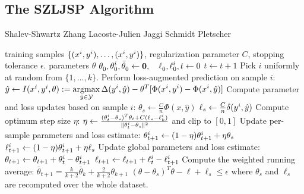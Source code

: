 \subsection{The SZLJSP Algorithm}
\begin{algorithm}[tp]
    \caption{Shalev-Shwartz Zhang Lacoste-Julien Jaggi Schmidt Pletscher\label{alg_szljsp}}
    \begin{doublespacing}
    \begin{algorithmic}[1]
        \Require training samples $\{ (x^{i}, y^{i}), \dots, (x^{i}, y^{i})\}$, regularization parameter $C$, stopping tolerance $\epsilon$.
        \Ensure parameters $\theta$
        \State  $\displaystyle \theta_0^{\vphantom{i}}, \theta_0^{i}, \bar{\theta}_0^{\vphantom{i}} \leftarrow \mathbf{0},\quad \ell_0^{\vphantom{i}}, \ell_0^{i}, t \leftarrow 0 $
        \Repeat
            \State $t \leftarrow t + 1$
            \State Pick $i$ uniformly at random from $\{1, \dotsc, k\}$.
            \State Perform loss-augmented prediction on sample $i$:
            \Statex[2]   $\hat{y} \leftarrow I(x^{i}, y^{i}, \theta) := \displaystyle \operatorname*{argmax}_{\hat{y}\in\mathcal{Y}} \Delta(y^{i}, \hat{y}) - \theta^T [\Phi(x^{i}, y^{i}) - \Phi(x^{i}, \hat{y})]$
            \State Compute parameter and loss updates based on sample $i$:
            \Statex[2]     $\theta_s \leftarrow \frac{C}{n} \Phi(x, \hat{y})$
            \Statex[2]     $\ell_s \leftarrow \frac{C}{n} \delta(y^{i}, \hat{y})$
            \State Compute optimum step size $\eta$:
            \Statex[2]    $\eta \leftarrow \frac{(\theta_t^{i} - \theta_s)^T \theta_t + C (\ell_s - \ell_k^{i} )}{\lVert \theta_t^{i} - \theta_s \rVert^2}$ and clip to $[0, 1]$
            \State Update per-sample parameters and loss estimate:
            \Statex[2]    $\theta_{t+1}^{i} \leftarrow (1 - \eta) \theta_{t+1}^{i} + \eta \theta_s$
            \Statex[2]    $\ell_{t+1}^{i} \leftarrow (1 - \eta) \theta_{t+1}^{i} + \eta \ell_s$
            \State Update global parameters and loss estimate:
            \Statex[2]   $\theta_{t+1} \leftarrow \theta_{t+1} + \theta_{t}^{i} - \theta_{t+1}^{i}$
            \Statex[2]   $\ell_{t+1} \leftarrow \ell_{t+1} + \ell_{t}^{i} - \ell_{t+1}^{i}$
            \State Compute the weighted running average:
            \Statex[2] $\bar{\theta}_{t+1} = \frac{k}{k + 2} \bar{\theta}_k + \frac{2}{k + 2}\theta_{k+1}$
        \Until $(\theta - \theta_s)^T\theta - \ell + \ell_s \leq \epsilon$
        \Statex where $\theta_s$ and $\ell_s$ are recomputed over the whole dataset.
    \end{algorithmic}
    \end{doublespacing}
\end{algorithm}

